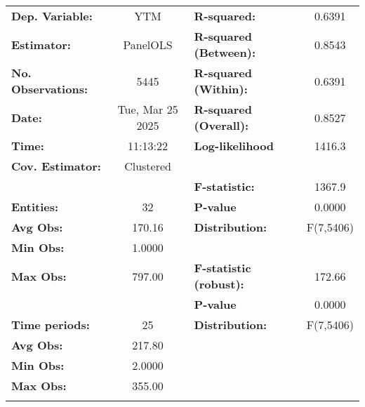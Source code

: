 \begin{center}
\begin{tabular}{lclc}
\toprule
\textbf{Dep. Variable:}         &        YTM         & \textbf{  R-squared:         }   &      0.6391      \\
\textbf{Estimator:}             &      PanelOLS      & \textbf{  R-squared (Between):}  &      0.8543      \\
\textbf{No. Observations:}      &        5445        & \textbf{  R-squared (Within):}   &      0.6391      \\
\textbf{Date:}                  &  Tue, Mar 25 2025  & \textbf{  R-squared (Overall):}  &      0.8527      \\
\textbf{Time:}                  &      11:13:22      & \textbf{  Log-likelihood     }   &      1416.3      \\
\textbf{Cov. Estimator:}        &     Clustered      & \textbf{                     }   &                  \\
\textbf{}                       &                    & \textbf{  F-statistic:       }   &      1367.9      \\
\textbf{Entities:}              &         32         & \textbf{  P-value            }   &      0.0000      \\
\textbf{Avg Obs:}               &       170.16       & \textbf{  Distribution:      }   &    F(7,5406)     \\
\textbf{Min Obs:}               &       1.0000       & \textbf{                     }   &                  \\
\textbf{Max Obs:}               &       797.00       & \textbf{  F-statistic (robust):} &      172.66      \\
\textbf{}                       &                    & \textbf{  P-value            }   &      0.0000      \\
\textbf{Time periods:}          &         25         & \textbf{  Distribution:      }   &    F(7,5406)     \\
\textbf{Avg Obs:}               &       217.80       & \textbf{                     }   &                  \\
\textbf{Min Obs:}               &       2.0000       & \textbf{                     }   &                  \\
\textbf{Max Obs:}               &       355.00       & \textbf{                     }   &                  \\
\textbf{}                       &                    & \textbf{                     }   &                  \\

\end{tabular}
\end{center}
